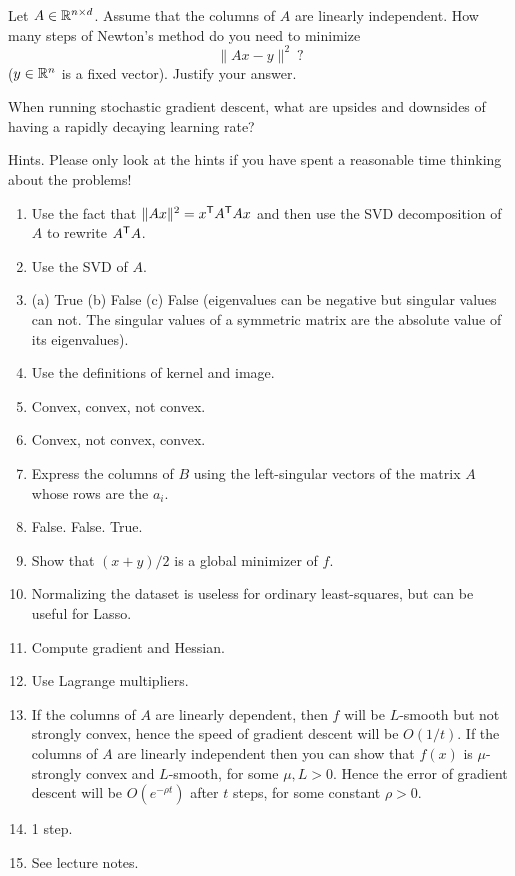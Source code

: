 \documentclass[11pt,nocut]{article}
\begin{document}
\begin{problem}
	Let $A \in \mathbb{R}^{n \times d}$. Assume that the columns of $A$ are linearly independent. How many steps of Newton's method do you need to minimize
	$$
	\|Ax - y\|^2 \ ?
	$$
	($y \in \mathbb{R}^n$ is a fixed vector). Justify your answer.
\end{problem}


\begin{problem}
	When running stochastic gradient descent, what are upsides and downsides of having a rapidly decaying learning rate?
\end{problem}

\newpage

\begin{center}
	{\Large
	Hints. Please only look at the hints if you have spent a reasonable time thinking about the problems!
	}
\end{center}
\begin{enumerate}
	\item Use the fact that $\|Ax\|^2 = x^{{\sf T}} A^{{\sf T}} A x$ and then use the SVD decomposition of $A$ to rewrite $A^{{\sf T}} A$.
	\item Use the SVD of $A$.
	\item (a) True (b) False (c) False (eigenvalues can be negative but singular values can not. The singular values of a symmetric matrix are the absolute value of its eigenvalues).
	\item Use the definitions of kernel and image.
	\item Convex, convex, not convex.
	\item Convex, not convex, convex.
	\item Express the columns of $B$ using the left-singular vectors of the matrix $A$ whose rows are the $a_i$.
	\item False. False. True.
	\item Show that $(x+y)/2$ is a global minimizer of $f$.
	\item Normalizing the dataset is useless for ordinary least-squares, but can be useful for Lasso.
	\item Compute gradient and Hessian. 
	\item Use Lagrange multipliers.
	\item If the columns of $A$ are linearly dependent, then $f$ will be $L$-smooth but not strongly convex, hence the speed of gradient descent will be $O(1/t)$.
		If the columns of $A$ are linearly independent then you can show that $f(x)$ is $\mu$-strongly convex and $L$-smooth, for some $\mu,L>0$. Hence the error of gradient descent will be $O(e^{-\rho t})$ after $t$ steps, for some constant $\rho>0$. 
	\item 1 step.
	\item See lecture notes.
\end{enumerate}

\vspace{1cm}
\centerline{}

%
%
\end{document}
